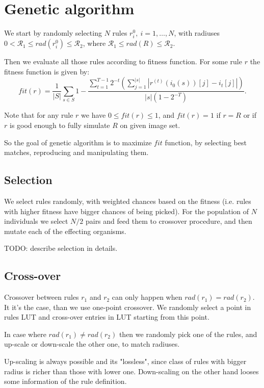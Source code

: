 \documentclass[12pt,a4paper]{article}
\begin{document}
\section{Genetic algorithm}

We start by randomly selecting $N$ rules $r^{0}_i,\ i=1,\ldots,N$,  with radiuses $0< \mathcal{R}_1 \leq rad(r^{0}_i) \leq \mathcal{R}_2$, where $\mathcal{R}_1\leq rad(R)\leq \mathcal{R}_2$. 

Then we evaluate all those rules according to fitness function. For some rule $r$ the fitness function is given by:
\[
fit(r) = \frac{1}{|S|}\sum_{s\in S} 1 - \frac{\sum_{t=1}^{T-1}  2^{-t}\left(\sum_{j=1}^{|s|} |r^{(t)}(i_0(s))[j] - i_{t}[j]|\right)}{|s|(1-2^{-T})}.
\]

Note that for any rule $r$ we have $0\leq fit(r) \leq 1$, and $fit(r) = 1$ if $r = R$ or if $r$ is good enough to fully simulate $R$ on given image set. 

So the goal of genetic algorithm is to maximize $fit$ function, by selecting best matches, reproducing and manipulating them.

\subsection{Selection}

We select rules randomly, with weighted chances based on the fitness (i.e. rules with higher fitness have bigger chances of being picked). For the population of $N$ individuals we select $N/2$ pairs and feed them to crossover procedure, and then mutate each of the effecting organisms.

TODO: describe selection in details.

\subsection{Cross-over}

Crossover between rules $r_1$ and $r_2$ can only happen when $rad(r_1) = rad(r_2)$. It it's the case, than we use one-point crossover. We randomly select a point in rules LUT and cross-over entries in LUT starting from this point. 

In case where $rad(r_1)\neq rad(r_2)$ then we randomly pick one of the rules, and up-scale or down-scale the other one, to match radiuses.

Up-scaling is always possible and its "lossless", since class of rules with bigger radius is richer than those with lower one. Down-scaling on the other hand looses some information of the rule definition.
\end{document}
